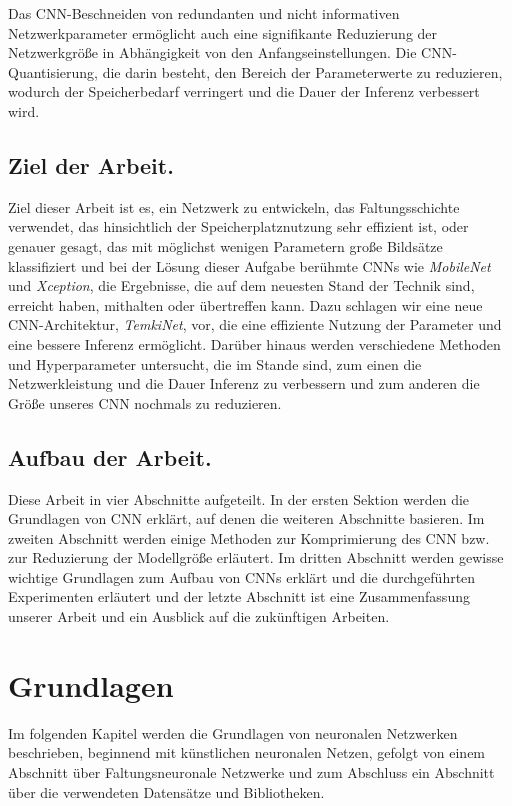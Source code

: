\documentclass[12pt,a4paper]{scrartcl}
\numberwithin{equation}{section}
\begin{document}
Das CNN-Beschneiden von redundanten und nicht informativen Netzwerkparameter ermöglicht auch eine signifikante Reduzierung der Netzwerkgröße in Abhängigkeit von den Anfangseinstellungen.
Die CNN-Quantisierung, die darin besteht, den Bereich der Parameterwerte zu reduzieren, wodurch der Speicherbedarf verringert und die Dauer der Inferenz verbessert wird.

\subsection{Ziel der Arbeit.}

Ziel dieser Arbeit ist es, ein Netzwerk zu entwickeln, das Faltungsschichte verwendet, das hinsichtlich der Speicherplatznutzung sehr effizient ist, oder genauer gesagt, das mit möglichst wenigen Parametern große Bildsätze klassifiziert und bei der Lösung dieser Aufgabe  berühmte CNNs wie \textit{MobileNet} und \textit{Xception}, die Ergebnisse, die auf dem neuesten Stand der Technik sind, erreicht haben, mithalten oder übertreffen kann. Dazu schlagen wir eine neue CNN-Architektur, \textit{TemkiNet}, vor, die eine effiziente Nutzung der Parameter und eine bessere Inferenz ermöglicht. Darüber hinaus werden verschiedene Methoden und Hyperparameter untersucht, die im Stande sind, zum einen die Netzwerkleistung und die Dauer Inferenz zu verbessern und zum anderen die Größe unseres \ac{CNN} nochmals zu reduzieren.  


\subsection{Aufbau der Arbeit.}
Diese Arbeit in vier Abschnitte aufgeteilt. In der ersten Sektion werden die Grundlagen von CNN erklärt, auf denen die weiteren Abschnitte basieren. Im zweiten Abschnitt werden einige Methoden zur Komprimierung des CNN bzw. zur Reduzierung der Modellgröße erläutert. Im dritten Abschnitt werden gewisse wichtige Grundlagen zum Aufbau von \acsp{CNN} erklärt und die durchgeführten Experimenten erläutert und der letzte Abschnitt ist eine Zusammenfassung unserer Arbeit und ein Ausblick auf die zukünftigen Arbeiten.

 \newpage  %
 
\section{Grundlagen}\label{Grundlagen}
Im folgenden Kapitel werden die Grundlagen von neuronalen Netzwerken beschrieben, beginnend mit künstlichen neuronalen Netzen, gefolgt von einem Abschnitt über Faltungsneuronale Netzwerke und
zum Abschluss ein Abschnitt über die verwendeten Datensätze und Bibliotheken.
\end{document}
